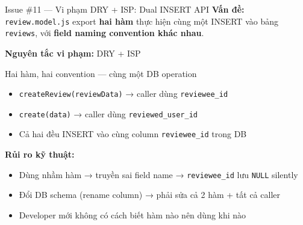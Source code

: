 \documentclass[12pt]{beamer}
\begin{document}
\begin{frame}{Issue \#11 — Vi phạm DRY + ISP: Dual INSERT API}
  \textbf{Vấn đề:} \texttt{review.model.js} export \textbf{hai hàm} thực hiện cùng một INSERT vào bảng \texttt{reviews}, với \textbf{field naming convention khác nhau}.

  \bigskip
  \textbf{Nguyên tắc vi phạm:} \alert{DRY} + \alert{ISP}

  \bigskip
  \begin{block}{Hai hàm, hai convention — cùng một DB operation}
    \begin{itemize}
      \item \texttt{createReview(reviewData)} → caller dùng \texttt{reviewee\_id} 
      \item \texttt{create(data)} → caller dùng \texttt{reviewed\_user\_id} 
      \item Cả hai đều INSERT vào cùng column \texttt{reviewee\_id} trong DB
    \end{itemize}
  \end{block}

  \bigskip
  \textbf{Rủi ro kỹ thuật:}
  \begin{itemize}
    \item Dùng nhầm hàm → truyền sai field name → \texttt{reviewee\_id} lưu \texttt{NULL} silently
    \item Đổi DB schema (rename column) → phải sửa cả 2 hàm + tất cả caller
    \item Developer mới không có cách biết hàm nào nên dùng khi nào
  \end{itemize}
\end{frame}
\end{document}
